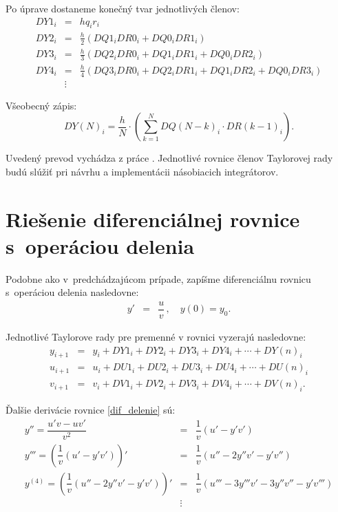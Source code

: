 Po úprave dostaneme konečný tvar jednotlivých členov:
\begin{eqnarray}
DY1_{i} & = & hq_{i}r_{i} \label{DY1_cleny_nasobenia} \\
DY2_{i} & = & \frac{h}{2} (DQ1_{i}DR0_{i} + DQ0_{i}DR1_{i}) \label{DY2_cleny_nasobenia} \\
DY3_{i} & = & \frac{h}{3} (DQ2_{i}DR0_{i} + DQ1_{i}DR1_{i} + DQ0_{i}DR2_{i}) \label{DY3_cleny_nasobenia} \\
DY4_{i} & = & \frac{h}{4} (DQ3_{i}DR0_{i} + DQ2_{i}DR1_{i} + DQ1_{i}DR2_{i} + DQ0_{i}DR3_{i}) \label{DY4_cleny_nasobenia} \\
& \vdots \nonumber &
\end{eqnarray}

Všeobecný zápis:
\begin{equation}
DY(N)_{i} = \dfrac{h}{N} \cdot \left( \sum_{k=1}^N DQ(N-k)_{i} \cdot DR(k-1)_{i} \right) . \label{suma_mul}
\end{equation}

Uvedený prevod vychádza z práce \cite{ZavadaBP}. Jednotlivé rovnice členov Taylorovej rady budú slúžiť pri návrhu a implementácii násobiacich integrátorov.


\section{Riešenie diferenciálnej rovnice s~operáciou delenia}
Podobne ako v~predchádzajúcom prípade, zapíšme diferenciálnu rovnicu s~operáciou delenia nasledovne:
\begin{eqnarray}
y' & = & \dfrac{u}{v} \, , \quad y(0) = y_{0} . \label{dif_delenie}
\end{eqnarray}



Jednotlivé Taylorove rady pre premenné v rovnici vyzerajú nasledovne:
\begin{eqnarray}
y_{i + 1} & = & y_{i} + DY1_{i} + DY2_{i} + DY3_{i} + DY4_{i} + \cdots + DY(n)_{i}\\
u_{i+1} & = & u_i + DU1_i + DU2_i + DU3_i + DU4_i + \cdots + DU(n)_i\\
v_{i+1} & = & v_i + DV1_i + DV2_i + DV3_i + DV4_i + \cdots + DV(n)_i .
\end{eqnarray}



Ďalšie derivácie rovnice \eqref{dif_delenie} sú:
\begin{eqnarray}
y'' = \dfrac{u'v - uv'}{v^{2}} & = & \dfrac{1}{v} (u' - y'v') \label{derivacie_delenie} \\
y''' = \left( \dfrac{1}{v} (u' - y'v') \right)' & = & \dfrac{1}{v} (u'' - 2y''v' - y'v'') \nonumber \\
y^{(4)} = \left( \dfrac{1}{v} (u'' - 2y''v' - y'v') \right)' & = & \dfrac{1}{v} (u''' - 3y'''v' - 3y''v'' - y'v''') \nonumber \\
 & \vdots \nonumber &
\end{eqnarray}

